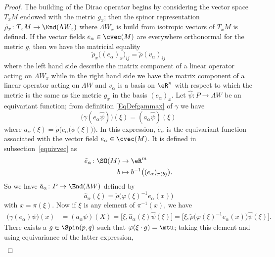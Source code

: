 \begin{proof}
	The building of the Dirac operator begins by considering the vector space $T_xM$ endowed with the metric $g_x$; then the spinor representation $\tilde\rho_x\colon T_xM\to \End(\Lambda W_x)$ where $\Lambda W_x$ is build from isotropic vectors of $T_xM$ is defined. If the vector fields $e_{\alpha}\in\cvec(M)$ are everywhere orthonormal for the metric $g$, then we have the matricial equality
	\begin{equation}
		\tilde\rho_x\big( (e_{\alpha})_x \big)_{ij}=\tilde\rho(v_{\alpha})_{ij}
	\end{equation}
	where the left hand side describe the matrix component of a linear operator acting on $\Lambda W_x$ while in the right hand side we have the matrix component of a linear operator acting on $\Lambda W$ and $v_{\alpha}$ is a basis on $\eR^n$ with respect to which the metric is the same as the metric $g_x$ in the basis $(e_{\alpha})_x$. Let $\hat{\psi}\colon P\to \Lambda W$ be an equivariant function; from definition \eqref{EqDefgammax} of $\gamma$ we have
	\[
		\big( \gamma(e_{\alpha}\hat{\psi}) \big)(\xi)=(a_{\alpha}\hat{\psi})(\xi)
	\]
	where $a_{\alpha}(\xi)=\tilde\rho\Big( \tilde{e}_{\alpha}\big( \phi(\xi) \big) \Big)$. In this expression, $\tilde{e}_{\alpha}$ is the equivariant function associated with the vector field $e_{\alpha}\in\cvec(M)$. It is defined in subsection~\ref{equivvec} as
	\begin{equation}
		\begin{aligned}
			\tilde{e}_{\alpha}\colon \SO(M) & \to \eR^m                                        \\
			b                               & \mapsto b^{-1}\big( (e_{\alpha})_{\pi(b)} \big).
		\end{aligned}
	\end{equation}
	So we have $\hat a_{\alpha}\colon P\to \End(\Lambda W)$ defined by
	\[
		\hat a_{\alpha}(\xi)=\tilde\rho\big( \varphi(\xi)^{-1}e_{\alpha}(x) \big)
	\]
	with $x=\pi(\xi)$. Now if $\xi$ is any element of $\pi^{-1}(x)$, we have
	\begin{align*}
		\big( \gamma(e_{\alpha})\psi \big)(x) & =(a_{\alpha}\psi)(X)=\big[ \xi,\hat a_{\alpha}(\xi)\hat\psi(\xi) \big]
		=\big[ \xi,\tilde\rho\big( \varphi(\xi)^{-1}e_{\alpha}(x) \big)\hat{\psi}(\xi) \big].
	\end{align*}
	There exists a $g\in\Spin(p,q)$ such that $\varphi(\xi\cdot g)=\mtu$; taking this element and using equivariance of the latter expression,
	\begin{align}

\end{align}
\end{proof}

